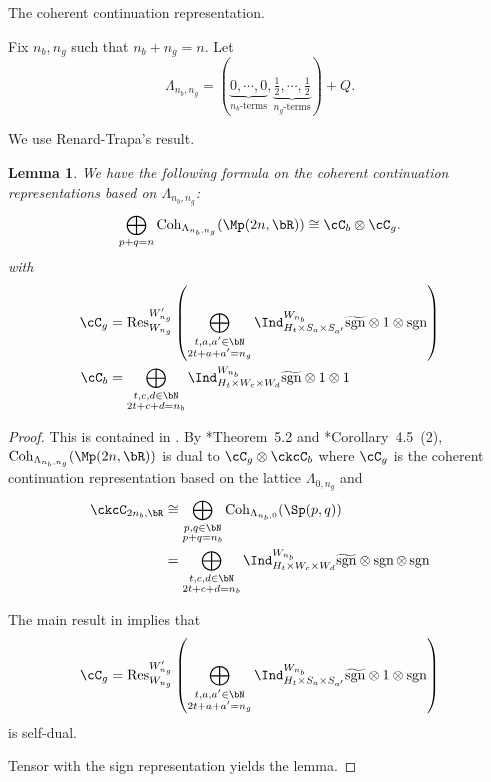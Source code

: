 \documentclass[12pt,a4paper]{amsart}
\newcommand{\Res}{\mathrm{Res}}
\newcommand{\sgn}{\operatorname{sgn}}
\newcommand{\p}{\mathfrak p}
\numberwithin{equation}{section}
\newtheorem{lem}[thm]{Lemma}
\theoremstyle{remark}
\def\half{{\tfrac{1}{2}}}
\def\Cint#1{\Coh_{[#1]}}
\def\Coh{\mathrm{Coh}}
\def\hsgn{\widetilde{\mathrm{sgn}}}
\begin{document}
  The coherent continuation representation.


  Fix $n_{b},n_{g}$ such that $n_{b}+ n_{g} = n$. Let
  \begin{equation} \label{eq:Lam.C}
    \Lambda_{n_{b},n_{g}} = (\underbrace{0, \cdots, 0}_{n_{b}\text{-terms}}, \underbrace{\half, \cdots, \half}_{n_{g}\text{-terms}}) + Q.
  \end{equation}

  We use Renard-Trapa's result.

\begin{lem}
  We have the following formula on the coherent continuation
  representations based on $\Lambda_{n_{b},n_{g}}$:
  \[
    \bigoplus_{p+q=n} \Coh_{\Lambda_{n_b, n_g}}(\Mp(2n,\bR)) \cong \cC_{b}\otimes \cC_{g}.
  \]
  with
  \[
    \begin{split}
      \cC_g %
      &  = \Res_{W_{n_{g}}}^{W'_{n_{g}}}
      \left( \bigoplus_{\substack{t,a,a'\in \bN\\2t+a+a'=n_{g}}}
        \Ind_{H_{t}\times S_{a}\times S_{a'}}^{W_{n_{b}}}
        \hsgn\otimes 1 \otimes\sgn \right)\\
      \cC_b & =
      \bigoplus_{\substack{t,c,d\in \bN\\2t+c+d=n_{b}}}
      \Ind_{H_{t}\times W_{c}\times W_{d}}^{W_{n_{b}}} \hsgn\otimes 1\otimes 1
    \end{split}
  \]
\end{lem}
\begin{proof}
  This is contained in \cite{RT1,RT2}.
  By \cite{RT2}*{Theorem~5.2} and \cite{RT2}*{Corollary~4.5~(2)},
  $ \Coh_{\Lambda_{n_{b},n_{g}}}(\Mp(2n,\bR)) $
  is dual to $\cC_{g}\otimes \ckcC_{b}$ where
  $\cC_{g}$ is the coherent continuation representation based on the
  lattice $\Lambda_{0,n_{g}}$
  and
  \[
    \begin{split}
      \ckcC_{2n_{b},\bR} &\cong \bigoplus_{\substack{p,q\in \bN\\p+q=n_{b}}}
      \Coh_{\Lambda_{n_{b},0}}(\Sp(p,q))\\
      & = \bigoplus_{\substack{t,c,d\in \bN\\2t+c+d=n_{b}}} \Ind_{H_{t}\times W_{c}\times W_{d}}^{W_{n_{b}}} \hsgn\otimes \sgn \otimes\sgn
    \end{split}
  \]

  The main result in \cite{RT1} implies that
  \[
    \cC_{g} = \Res_{W_{n_{g}}}^{W'_{n_{g}}} \left(
  \bigoplus_{\substack{t,a,a'\in \bN\\2t+a+a'=n_{g}}} \Ind_{H_{t}\times S_{a}\times S_{a'}}^{W_{n_{b}}} \hsgn\otimes 1 \otimes\sgn
  \right)
  \]
  is self-dual.

  Tensor with the sign representation yields the lemma.
\end{proof}
\end{document}
